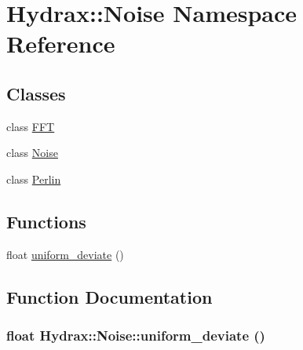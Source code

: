 \hypertarget{namespace_hydrax_1_1_noise}{
\section{Hydrax::Noise Namespace Reference}
\label{namespace_hydrax_1_1_noise}
}
\subsection*{Classes}
\begin{CompactItemize}
\item 
class \hyperlink{class_hydrax_1_1_noise_1_1_f_f_t}{FFT}
\item 
class \hyperlink{class_hydrax_1_1_noise_1_1_noise}{Noise}
\item 
class \hyperlink{class_hydrax_1_1_noise_1_1_perlin}{Perlin}
\end{CompactItemize}
\subsection*{Functions}
\begin{CompactItemize}
\item 
float \hyperlink{namespace_hydrax_1_1_noise_1686d4278255202271a4fa47f33979b7}{uniform\_\-deviate} ()
\end{CompactItemize}


\subsection{Function Documentation}
\hypertarget{namespace_hydrax_1_1_noise_1686d4278255202271a4fa47f33979b7}{
\subsubsection[{uniform\_\-deviate}]{\setlength{\rightskip}{0pt plus 5cm}float Hydrax::Noise::uniform\_\-deviate ()}}
\label{namespace_hydrax_1_1_noise_1686d4278255202271a4fa47f33979b7}


